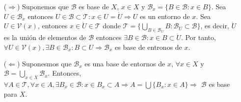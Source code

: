 \begin{dem}
  \begin{enumerate}[label=(\roman*)]
    \item [($\Rightarrow$)] Suponemos que $\mathcal{B}$ es base de $X$, $x \in X$ y $\mathcal{B}_{x} = \{ B \in \mathcal{B} : x \in B \}$. Sea $U \in \mathcal{B}_{x}$ entonces $ U \in \mathcal{B} \subset \mathcal{T}: x \in U = \mathring{U} \Rightarrow U$ es un entorno de $x$. Sea $U \in \mathcal{V}(x)$, entonces $x \in \mathring{U}\in \mathcal{T}$ donde $\mathcal{T} = \{ \bigcup_{B \in \mathcal{B}_{U}} B : \mathcal{B}_{U} \subset \mathcal{B} \}$, es decir, $\mathring{U}$ es la unión de elementos de $\mathcal{B}$ entonces $\exists B \in \mathcal{B}: x \in B \subset \mathring{U}$. Por tanto, $\forall U \in \mathcal{V}(x), \exists B \in \mathcal{B}_{x} : B \subset U \Rightarrow \mathcal{B}_{x}$ es base de entronos de $x$.
    \item [($\Leftarrow$)] Suponesmos que $\mathcal{B}_{x}$ es una base de entornos de $x$, $\forall x \in X$ y $\mathcal{B} = \bigcup_{x \in X} \mathcal{B}_{x}$. Entonces, $\forall A \in \mathcal{T}, \forall x \in A , \exists B_{x} \in \mathcal{B} : x \in B_{x} \subset A \Rightarrow A = \bigcup \{ B_{x} : x \in A \} \Rightarrow$ $\mathcal{B}$ es base para $X$.
  \end{enumerate}
\end{dem}
